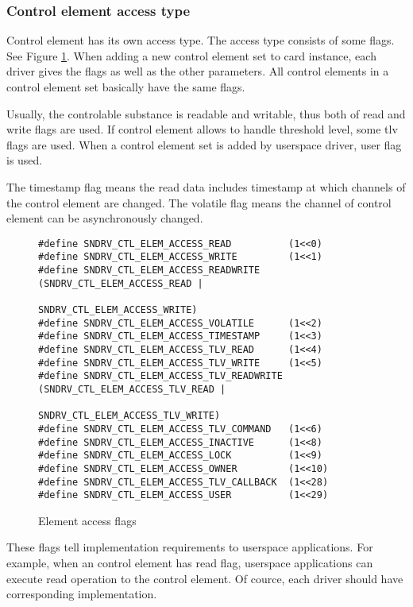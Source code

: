 \documentclass[onecolumn]{article}
\begin{document}
\subsubsection{Control element access type}

Control element has its own access type. The access type consists of some flags. See Figure \ref{fig:element-access-flags}. When adding a new control element set to card instance, each driver gives the flags as well as the other parameters. All control elements in a control element set basically have the same flags.

Usually, the controlable substance is readable and writable, thus both of read and write flags are used. If control element allows to handle threshold level, some tlv flags are used. When a control element set is added by userspace driver, user flag is used.

The timestamp flag means the read data includes timestamp at which channels of the control element are changed. The volatile flag means the channel of control element can be asynchronously changed.

\begin{figure}[htbp]
\small
\begin{verbatim}
#define SNDRV_CTL_ELEM_ACCESS_READ          (1<<0)
#define SNDRV_CTL_ELEM_ACCESS_WRITE         (1<<1)
#define SNDRV_CTL_ELEM_ACCESS_READWRITE     (SNDRV_CTL_ELEM_ACCESS_READ |
                                             SNDRV_CTL_ELEM_ACCESS_WRITE)
#define SNDRV_CTL_ELEM_ACCESS_VOLATILE      (1<<2)
#define SNDRV_CTL_ELEM_ACCESS_TIMESTAMP     (1<<3)
#define SNDRV_CTL_ELEM_ACCESS_TLV_READ      (1<<4)
#define SNDRV_CTL_ELEM_ACCESS_TLV_WRITE     (1<<5)
#define SNDRV_CTL_ELEM_ACCESS_TLV_READWRITE (SNDRV_CTL_ELEM_ACCESS_TLV_READ |
                                             SNDRV_CTL_ELEM_ACCESS_TLV_WRITE)
#define SNDRV_CTL_ELEM_ACCESS_TLV_COMMAND   (1<<6)
#define SNDRV_CTL_ELEM_ACCESS_INACTIVE      (1<<8)
#define SNDRV_CTL_ELEM_ACCESS_LOCK          (1<<9)
#define SNDRV_CTL_ELEM_ACCESS_OWNER         (1<<10)
#define SNDRV_CTL_ELEM_ACCESS_TLV_CALLBACK  (1<<28)
#define SNDRV_CTL_ELEM_ACCESS_USER          (1<<29)
\end{verbatim}
\caption{{Element access flags}}
\label{fig:element-access-flags}
\end{figure}

These flags tell implementation requirements to userspace applications. For example, when an control element has read flag, userspace applications can execute read operation to the control element. Of cource, each driver should have corresponding implementation.
\end{document}
